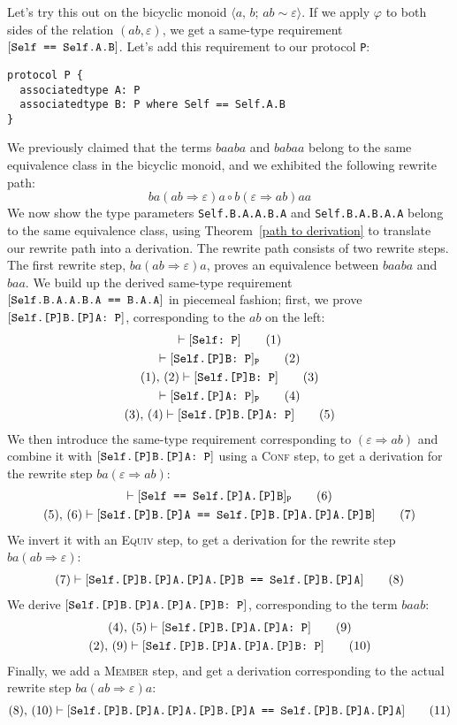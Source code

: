 \documentclass[../generics]{subfiles}
\begin{document}
Let's try this out on the bicyclic monoid $\langle a,\,b;\,ab\sim\varepsilon\rangle$. If we apply $\varphi$ to both sides of the relation $(ab,\varepsilon)$, we get a same-type requirement $[\texttt{Self == Self.A.B}]$. Let's add this requirement to our protocol \texttt{P}:
\begin{Verbatim}
protocol P {
  associatedtype A: P
  associatedtype B: P where Self == Self.A.B
}
\end{Verbatim}
We previously claimed that the terms $baaba$ and $babaa$ belong to the same equivalence class in the bicyclic monoid, and we exhibited the following rewrite path:
\[
ba(ab\Rightarrow\varepsilon)a \circ
b(\varepsilon\Rightarrow ab)aa
\]
We now show the type parameters \verb|Self.B.A.A.B.A| and \verb|Self.B.A.B.A.A| belong to the same equivalence class, using Theorem~\ref{path to derivation} to translate our rewrite path into a derivation. The rewrite path consists of two rewrite steps. The first rewrite step, $ba(ab\Rightarrow\varepsilon)a$, proves an equivalence between $baaba$ and $baa$. We build up the derived same-type requirement $[\texttt{Self.B.A.A.B.A == B.A.A}]$ in piecemeal fashion; first, we prove $[\texttt{Self.[P]B.[P]A:~P}]$, corresponding to the $ab$ on the left:
\begin{gather*}
\vdash[\texttt{Self:~P}]\tag{1}\\
\vdash[\texttt{Self.[P]B:~P}]_\texttt{P}\tag{2}\\
(1),\,(2)\vdash[\texttt{Self.[P]B:~P}]\tag{3}\\
\vdash[\texttt{Self.[P]A:~P}]_\texttt{P}\tag{4}\\
(3),\,(4)\vdash[\texttt{Self.[P]B.[P]A:~P}]\tag{5}
\end{gather*}
We then introduce the same-type requirement corresponding to $(\varepsilon\Rightarrow ab)$ and combine it with $[\texttt{Self.[P]B.[P]A:~P}]$ using a \textsc{Conf} step, to get a derivation for the rewrite step $ba(\varepsilon\Rightarrow ab)$:
\begin{gather*}
\vdash[\texttt{Self == Self.[P]A.[P]B}]_\texttt{P}\tag{6}\\
(5),\,(6)\vdash[\texttt{Self.[P]B.[P]A == Self.[P]B.[P]A.[P]A.[P]B}]\tag{7}
\end{gather*}
We invert it with an \textsc{Equiv} step, to get a derivation for the rewrite step $ba(ab\Rightarrow \varepsilon)$:
\begin{gather*}
(7)\vdash[\texttt{Self.[P]B.[P]A.[P]A.[P]B == Self.[P]B.[P]A}]\tag{8}
\end{gather*}
We derive $[\texttt{Self.[P]B.[P]A.[P]A.[P]B:~P}]$, corresponding to the term $baab$:
\begin{gather*}
(4),\,(5)\vdash[\texttt{Self.[P]B.[P]A.[P]A:~P}]\tag{9}\\
(2),\,(9)\vdash[\texttt{Self.[P]B.[P]A.[P]A.[P]B:~P}]\tag{10}
\end{gather*}
Finally, we add a \textsc{Member} step, and get a derivation corresponding to the actual rewrite step $ba(ab\Rightarrow\varepsilon)a$:
\begin{gather*}
(8),\,(10)\vdash[\texttt{Self.[P]B.[P]A.[P]A.[P]B.[P]A == Self.[P]B.[P]A.[P]A}]\tag{11}
\end{gather*}
\end{document}
